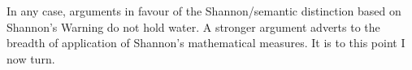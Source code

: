 In any case, arguments in favour of the Shannon/semantic distinction based on {\sc Shannon's Warning} do not hold water.
A stronger argument adverts to the breadth of application of Shannon's mathematical measures.
It is to this point I now turn.







